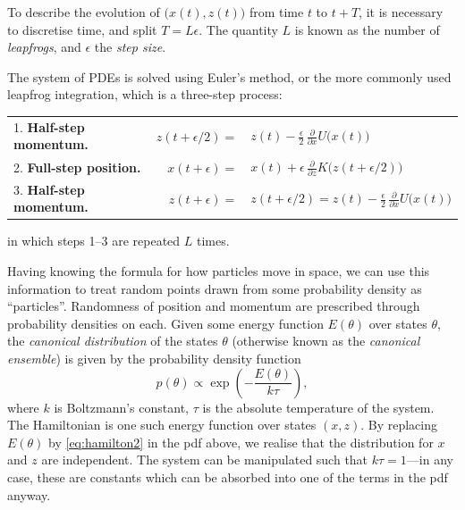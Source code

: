 To describe the evolution of $\big(x(t),z(t)\big)$ from time $t$ to $t+T$, it is necessary to discretise time, and split $T = L\epsilon$.
The quantity $L$ is known as the number of \emph{leapfrogs}, and $\epsilon$ the \emph{step size}.
\begin{center}
\end{center}
The system of PDEs is solved using Euler's method, or the more commonly used leapfrog integration, which is a three-step process:
\begin{table}[H]
  \centering
  \begin{tabular}{lrl}
    1. \textbf{Half-step momentum.} 
    &$z(t + \epsilon/2) =$ 
    &\hspace{-7pt}$z(t) - \frac{\epsilon}{2} \, \frac{\partial}{\partial x} U \big( x(t) \big)$ \\[0.6em]
    2. \textbf{Full-step position.} 
    &$x(t + \epsilon) =$ 
    &\hspace{-7pt}$x(t) + \epsilon \, \frac{\partial}{\partial  z} K \big(  z(t + \epsilon / 2) \big)$ \\[0.6em]
    3. \textbf{Half-step momentum.} 
    &$z(t + \epsilon) =$ 
    &\hspace{-7pt}$z(t + \epsilon/2) =  z(t) - \frac{\epsilon}{2} \, \frac{\partial}{\partial x} U \big( x(t) \big)$ \\[0.6em]
  \end{tabular}
\end{table}
\vspace{-1.5em}
\noindent in which steps 1--3 are repeated $L$ times.

Having knowing the formula for how particles move in space, we can use this information to treat random points drawn from some probability density as ``particles''.
Randomness of position and momentum are prescribed through probability densities on each.
Given some energy function $E(\theta)$ over states $\theta$, the \emph{canonical distribution} of the states $\theta$ (otherwise known as the \emph{canonical ensemble}) is given by the probability density function
\[
  p(\theta) \propto \exp \left( -\frac{E(\theta)}{k\tau} \right),
\]
where $k$ is Boltzmann's constant, $\tau$ is the absolute temperature of the system.
The Hamiltonian is one such energy function over states $(x,z)$.
By replacing $E(\theta)$ by \cref{eq:hamilton2} in the pdf above, we realise that the distribution for $x$ and $z$ are independent.
The system can be manipulated such that $k\tau=1$---in any case, these are constants which can be absorbed into one of the terms in the pdf anyway.

